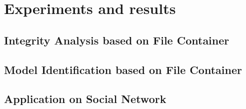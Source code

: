 \chapter{Experiments and results}

\section{Integrity Analysis based on File Container}


\section{Model Identification based on File Container}


\section{Application on Social Network}